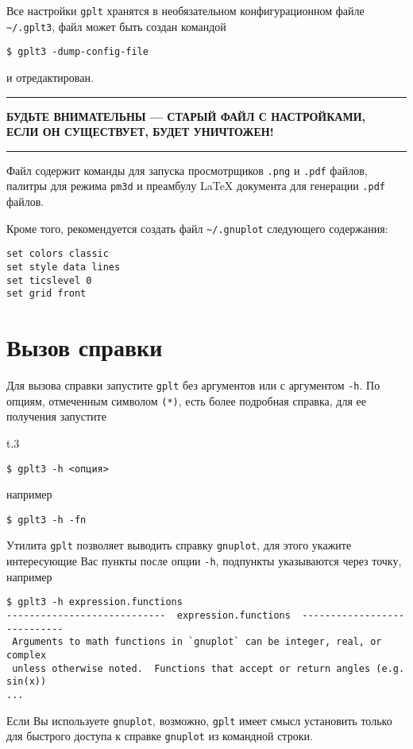 \documentclass[12pt]{article}
\def\gplt{{\tt gplt}}
\def\gnuplot{{\tt gnuplot}}
\def\png{{\tt .png}}
\def\pdf{{\tt .pdf}}
\begin{document}
Все настройки \gplt{} хранятся в необязательном конфигурационном файле  \verb'~/.gplt3',
файл может быть создан командой
\begin{verbatim}
$ gplt3 -dump-config-file
\end{verbatim}
и отредактирован.
\newpage

\hrule
\begin{center}
\bf БУДЬТЕ ВНИМАТЕЛЬНЫ --- СТАРЫЙ ФАЙЛ С НАСТРОЙКАМИ,\\
ЕСЛИ ОН СУЩЕСТВУЕТ, БУДЕТ УНИЧТОЖЕН!
  \end{center}
\hrule
\phantom{.}

Файл содержит команды для запуска просмотрщиков \png{} и \pdf{} файлов, палитры для режима \verb'pm3d' и преамбулу \LaTeX{} документа для генерации \pdf{} файлов.

Кроме того, рекомендуется создать файл \verb'~/.gnuplot' следующего содержания:
\begin{verbatim}
set colors classic
set style data lines
set ticslevel 0
set grid front
\end{verbatim}

\section{Вызов справки}
Для вызова справки запустите \gplt{} без аргументов или с аргументом \verb'-h'. По опциям, отмеченным символом \verb'(*)',
есть более подробная справка, для ее получения запустите
\begin{wrapfigure}[3]{t}{.3\textwidth}
\end{wrapfigure}
\begin{verbatim}
$ gplt3 -h <опция>
\end{verbatim}
например
\begin{verbatim}
$ gplt3 -h -fn
\end{verbatim}

Утилита \gplt{} позволяет выводить справку \gnuplot, для этого укажите интересующие Вас пункты после опции \verb'-h',
подпункты указываются через точку, например
\begin{verbatim}
$ gplt3 -h expression.functions
----------------------------  expression.functions  ----------------------------
 Arguments to math functions in `gnuplot` can be integer, real, or complex
 unless otherwise noted.  Functions that accept or return angles (e.g. sin(x))
...
\end{verbatim}
Если Вы используете \gnuplot, возможно, \gplt{} имеет смысл установить только для быстрого доступа к справке \gnuplot{} из командной строки.
\end{document}
